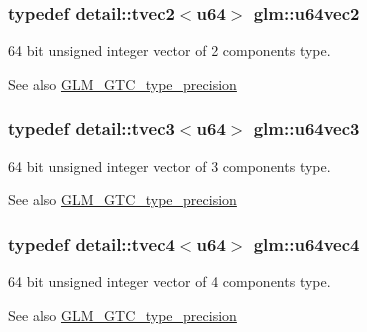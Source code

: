 \subsubsection[{u64vec2}]{\setlength{\rightskip}{0pt plus 5cm}typedef detail\+::tvec2$<$u64$>$ {\bf glm\+::u64vec2}}\label{group__gtc__type__precision_gad17df8c10793777ec3081fc40b801935}
64 bit unsigned integer vector of 2 components type. \begin{DoxySeeAlso}{See also}
\hyperlink{group__gtc__type__precision}{G\+L\+M\+\_\+\+G\+T\+C\+\_\+type\+\_\+precision} 
\end{DoxySeeAlso}
\hypertarget{group__gtc__type__precision_gaf3e98e85d5dd32134bf6235db89c9629}{}
\subsubsection[{u64vec3}]{\setlength{\rightskip}{0pt plus 5cm}typedef detail\+::tvec3$<$u64$>$ {\bf glm\+::u64vec3}}\label{group__gtc__type__precision_gaf3e98e85d5dd32134bf6235db89c9629}
64 bit unsigned integer vector of 3 components type. \begin{DoxySeeAlso}{See also}
\hyperlink{group__gtc__type__precision}{G\+L\+M\+\_\+\+G\+T\+C\+\_\+type\+\_\+precision} 
\end{DoxySeeAlso}
\hypertarget{group__gtc__type__precision_ga550e091ec7bcd4aff560a8f5c5ff539f}{}
\subsubsection[{u64vec4}]{\setlength{\rightskip}{0pt plus 5cm}typedef detail\+::tvec4$<$u64$>$ {\bf glm\+::u64vec4}}\label{group__gtc__type__precision_ga550e091ec7bcd4aff560a8f5c5ff539f}
64 bit unsigned integer vector of 4 components type. \begin{DoxySeeAlso}{See also}
\hyperlink{group__gtc__type__precision}{G\+L\+M\+\_\+\+G\+T\+C\+\_\+type\+\_\+precision} 
\end{DoxySeeAlso}
\hypertarget{group__gtc__type__precision_ga5e3dc67373d5068997d2d9f41c9024d2}{}
